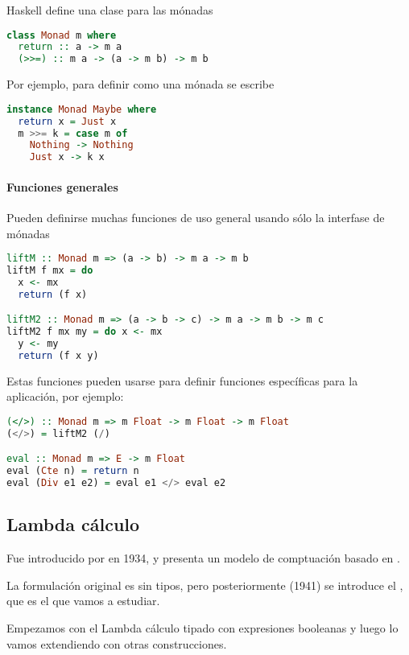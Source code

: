 Haskell define una clase para las mónadas

\begin{lstlisting}[language=Haskell]
class Monad m where
  return :: a -> m a
  (>>=) :: m a -> (a -> m b) -> m b
\end{lstlisting}

Por ejemplo, para definir  como una mónada se escribe

\begin{lstlisting}[language=Haskell]
instance Monad Maybe where
  return x = Just x
  m >>= k = case m of
    Nothing -> Nothing
    Just x -> k x
\end{lstlisting}

\paragraph{Funciones generales}

Pueden definirse muchas funciones de uso general usando sólo la interfase de mónadas
\begin{lstlisting}[language=Haskell]
liftM :: Monad m => (a -> b) -> m a -> m b
liftM f mx = do
  x <- mx
  return (f x)

liftM2 :: Monad m => (a -> b -> c) -> m a -> m b -> m c
liftM2 f mx my = do x <- mx
  y <- my
  return (f x y)
\end{lstlisting}

Estas funciones pueden usarse para definir funciones específicas para la aplicación, por ejemplo:

\begin{lstlisting}[language=Haskell]
(</>) :: Monad m => m Float -> m Float -> m Float
(</>) = liftM2 (/)

eval :: Monad m => E -> m Float
eval (Cte n) = return n
eval (Div e1 e2) = eval e1 </> eval e2
\end{lstlisting}

\subsection{Lambda cálculo}

Fue introducido por  en 1934, y presenta un modelo de comptuación basado en .

La formulación original es sin tipos, pero posteriormente (1941) se introduce el , que es el que vamos a estudiar.

Empezamos con el Lambda cálculo tipado con expresiones booleanas y luego lo vamos extendiendo con otras construcciones.


